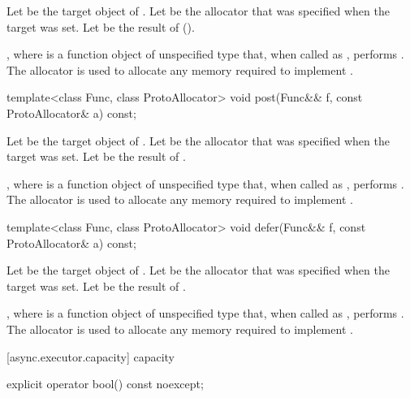 \begin{itemdescr}
\pnum
Let  be the target object of . Let  be the allocator that was specified when the target was set. Let  be the result of  ().

\pnum
\effects {}, where  is a function object of unspecified type that, when called as , performs . The allocator  is used to allocate any memory required to implement .
\end{itemdescr}

\begin{itemdecl}
template<class Func, class ProtoAllocator>
  void post(Func&& f, const ProtoAllocator& a) const;
\end{itemdecl}

\begin{itemdescr}
\pnum
Let  be the target object of . Let  be the allocator that was specified when the target was set. Let  be the result of .

\pnum
\effects {}, where  is a function object of unspecified type that, when called as , performs . The allocator  is used to allocate any memory required to implement .
\end{itemdescr}

\begin{itemdecl}
template<class Func, class ProtoAllocator>
  void defer(Func&& f, const ProtoAllocator& a) const;
\end{itemdecl}

\begin{itemdescr}
\pnum
Let  be the target object of . Let  be the allocator that was specified when the target was set. Let  be the result of .

\pnum
\effects {}, where  is a function object of unspecified type that, when called as , performs . The allocator  is used to allocate any memory required to implement .
\end{itemdescr}



[async.executor.capacity]{ capacity}

\begin{itemdecl}
explicit operator bool() const noexcept;
\end{itemdecl}

